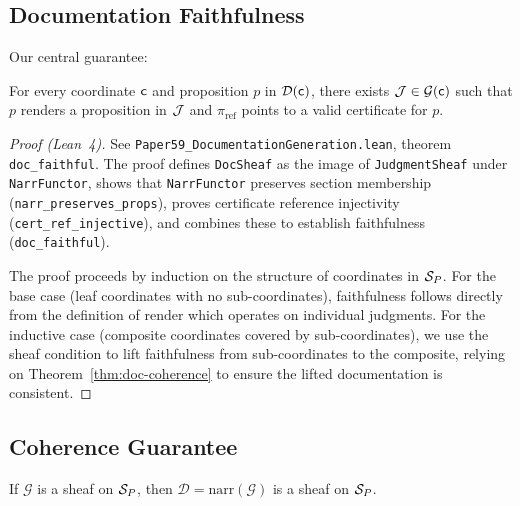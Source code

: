 \documentclass[11pt]{article}
\newcommand{\DocSheaf}{\mathcal{D}}
\newcommand{\CertRef}{\pi_{\mathrm{ref}}}
\newcommand{\NarrFunc}{\mathrm{narr}}
\newcommand{\RenderFunc}{\mathrm{render}}
\begin{document}
\subsection{Documentation Faithfulness}
Our central guarantee:

\begin{theorem}\label{thm:doc-faithful}
For every coordinate $\mathsf{c}$ and proposition $p$ in
$\DocSheaf(\coord)$, there exists $\mathcal{J} \in \mathcal{G}(\mathsf{c})$ such
that $p$ renders a proposition in $\mathcal{J}$ and $\CertRef$ points to a valid
certificate for $p$.
\end{theorem}

\begin{proof}[Proof (Lean~4)]
See \texttt{Paper59\_DocumentationGeneration.lean}, theorem
\texttt{doc\_faithful}.  The proof defines \texttt{DocSheaf} as the
image of \texttt{JudgmentSheaf} under \texttt{NarrFunctor}, shows that
\texttt{NarrFunctor} preserves section membership
(\texttt{narr\_preserves\_props}), proves certificate reference
injectivity (\texttt{cert\_ref\_injective}), and combines these to
establish faithfulness (\texttt{doc\_faithful}).

The proof proceeds by induction on the structure of coordinates in
$\mathcal{S}_P$.  For the base case (leaf coordinates with no sub-coordinates),
faithfulness follows directly from the definition of $\RenderFunc$
which operates on individual judgments.  For the inductive case
(composite coordinates covered by sub-coordinates), we use the sheaf
condition to lift faithfulness from sub-coordinates to the composite,
relying on Theorem~\ref{thm:doc-coherence} to ensure the lifted
documentation is consistent.
\end{proof}

\subsection{Coherence Guarantee}

\begin{theorem}\label{thm:doc-coherence-formal}
If $\mathcal{G}$ is a sheaf on $\mathcal{S}_P$, then $\DocSheaf =
\NarrFunc(\mathcal{G})$ is a sheaf on $\mathcal{S}_P$.
\end{theorem}
\end{document}
